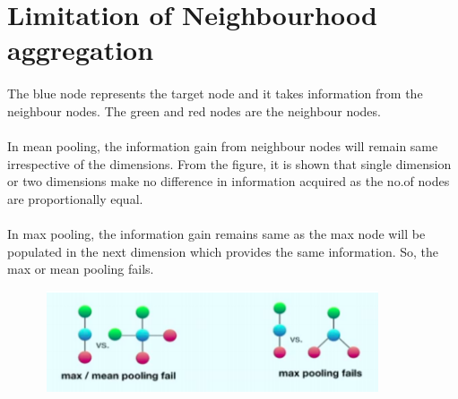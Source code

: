 \section{Limitation of Neighbourhood aggregation}
\paragraph{}The blue node represents the target node and it takes information from the neighbour nodes. The green and red nodes are the neighbour nodes.
\paragraph{}In mean pooling, the information gain from neighbour nodes will remain same irrespective of the dimensions. From the figure, it is shown that single dimension or two dimensions make no difference in information acquired as the no.of nodes are proportionally equal.
\paragraph{}In max pooling, the information gain remains same as the max node will be populated in the next dimension which provides the same information. So, the max or mean pooling fails.

\begin{figure}[h]
    \centering
    \includegraphics[width=10cm,height=3cm]{tex/img/Limitation.png}
\end{figure}